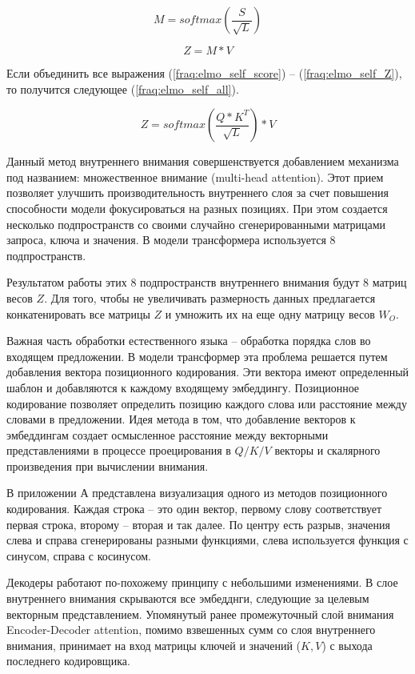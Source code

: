 \documentclass[a4paper,14pt]{article}
\begin{document}
\begin{equation}
	M = softmax(\dfrac{S}{\sqrt{L}})
	\label{fraq:elmo_self_softmax}
\end{equation}

\begin{equation}
	Z =  M * V
	\label{fraq:elmo_self_Z}
\end{equation}

Если объединить все выражения (\ref{fraq:elmo_self_score}) -- (\ref{fraq:elmo_self_Z}), то получится следующее (\ref{fraq:elmo_self_all}).

\begin{equation}
	Z =  softmax(\dfrac{Q * K^T}{\sqrt{L}}) * V
	\label{fraq:elmo_self_all}
\end{equation}

Данный метод внутреннего внимания совершенствуется добавлением механизма под названием: множественное внимание (multi-head attention).
Этот прием позволяет улучшить производительность внутреннего слоя за счет повышения способности модели фокусироваться на разных позициях.
При этом создается несколько подпространств со своими случайно сгенерированными матрицами запроса, ключа и значения.
В модели трансформера используется 8 подпространств.

Результатом работы этих 8 подпространств внутреннего внимания будут 8 матриц весов $Z$.
Для того, чтобы не увеличивать размерность данных предлагается конкатенировать все матрицы $Z$ и умножить их на еще одну матрицу весов $W_O$.

Важная часть обработки естественного языка -- обработка порядка слов во входящем предложении.
В модели трансформер эта проблема решается путем добавления вектора позиционного кодирования.
Эти вектора имеют определенный шаблон и добавляются к каждому входящему эмбеддингу.
Позиционное кодирование позволяет определить позицию каждого слова или расстояние между словами в предложении.
Идея метода в том, что добавление векторов к эмбеддингам создает осмысленное расстояние между векторными представлениями в процессе проецирования в $Q/K/V$ векторы и скалярного произведения при вычислении внимания.

В приложении А представлена визуализация одного из методов позиционного кодирования.
Каждая строка -- это один вектор, первому слову соответствует первая строка, второму -- вторая и так далее.
По центру есть разрыв, значения слева и справа сгенерированы разными функциями, слева используется функция с синусом, справа с косинусом.

Декодеры работают по-похожему принципу с небольшими изменениями.
В слое внутреннего внимания скрываются все эмбедднги, следующие за целевым векторным представлением.
Упомянутый ранее промежуточный слой внимания Encoder-Decoder attention, помимо взвешенных сумм со слоя внутреннего внимания, принимает на вход матрицы ключей и значений ($K,V$) с выхода последнего кодировщика.
\end{document}
